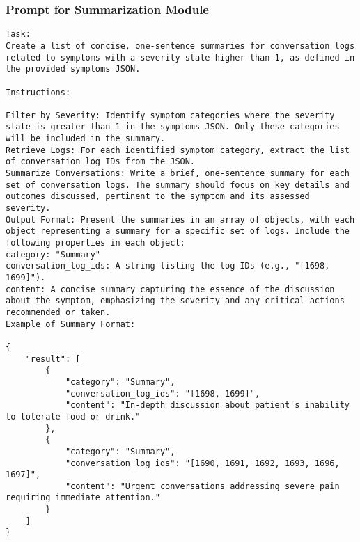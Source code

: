\subsubsection{Prompt for Summarization Module}
\begin{verbatim}
Task:
Create a list of concise, one-sentence summaries for conversation logs related to symptoms with a severity state higher than 1, as defined in the provided symptoms JSON.

Instructions:

Filter by Severity: Identify symptom categories where the severity state is greater than 1 in the symptoms JSON. Only these categories will be included in the summary.
Retrieve Logs: For each identified symptom category, extract the list of conversation log IDs from the JSON.
Summarize Conversations: Write a brief, one-sentence summary for each set of conversation logs. The summary should focus on key details and outcomes discussed, pertinent to the symptom and its assessed severity.
Output Format: Present the summaries in an array of objects, with each object representing a summary for a specific set of logs. Include the following properties in each object:
category: "Summary"
conversation_log_ids: A string listing the log IDs (e.g., "[1698, 1699]").
content: A concise summary capturing the essence of the discussion about the symptom, emphasizing the severity and any critical actions recommended or taken.
Example of Summary Format:

{
    "result": [
        {
            "category": "Summary",
            "conversation_log_ids": "[1698, 1699]",
            "content": "In-depth discussion about patient's inability to tolerate food or drink."
        },
        {
            "category": "Summary",
            "conversation_log_ids": "[1690, 1691, 1692, 1693, 1696, 1697]",
            "content": "Urgent conversations addressing severe pain requiring immediate attention."
        }
    ]
}
\end{verbatim}
